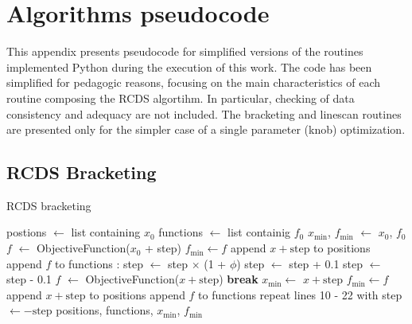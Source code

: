 \chapter{Algorithms pseudocode}
\label{chap:pseudocode}
This appendix presents pseudocode for simplified versions of the routines implemented Python during the execution of this work. The code has been simplified for pedagogic reasons, focusing on the main characteristics of each routine composing the RCDS algortihm. In particular, checking of data consistency and adequacy are not included. The bracketing and linescan routines are presented only for the simpler case of a single parameter (knob) optimization.
\section{RCDS Bracketing}
\begin{algorithm}
    \caption{RCDS bracketing}\label{alg:brackets}
    \begin{algorithmic}[1]
        \State postions $\gets$ list containing $x_0$
        \State functions $\gets$ list containig $f_0$
        \State $x_{\text{min}}$, $f_{\text{min}}$ $\gets$ $x_0$, $f_0$
        \State $f$ $\gets$ ObjectiveFunction($x_0$ + step)
            \State $f_{\text{min}}\gets f$
        \EndIf
        \State append $x + \text{step}$ to positions
        \State append $f$ to functions
        :
                \State step $\gets$ step $\times$ (1 + $\phi$)
                \State step $\gets$ step + 0.1
            \Else
                \State step $\gets$ step - 0.1
            \EndIf
            \State $f$ $\gets$ ObjectiveFunction($x + \text{step}$)
                \State \textbf{break}
            \EndIf
                \State $x_{\text{min}} \gets$ $x + \text{step}$
                \State $f_{\text{min}}\gets f$
            \EndIf
            \State append $x + \text{step}$ to positions
            \State append $f$ to functions
        \EndWhile
            \State repeat lines 10 - 22 with step $\gets - \text{step}$
        \EndIf
        \State \Return positions, functions, $x_{\text{min}}$, $f_{\text{min}}$
    \EndFunction
    \end{algorithmic}
    \end{algorithm}


